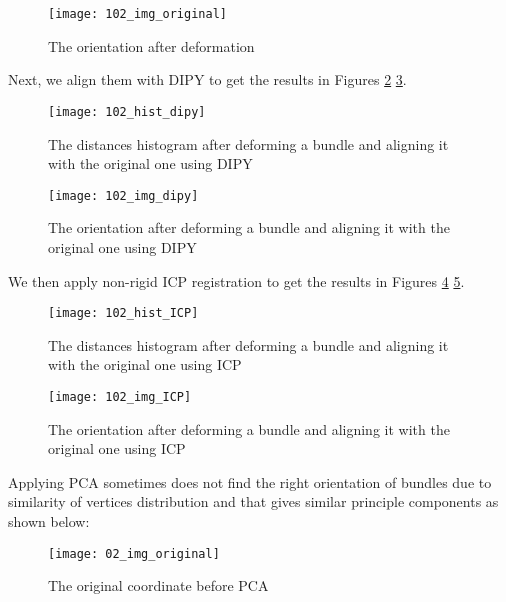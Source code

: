 \documentclass[../structure.tex]{subfiles}
\begin{document}
\begin{figure}[h!]
\centering
\texttt{[image: 102\_img\_original]}
\captionsetup{justification=centering}
\caption{The orientation after deformation}
\label{fig:img_original_def}
\end{figure}
\pagebreak

Next, we align them with DIPY to get the results in Figures \ref{fig:hist_dipy_def} \ref{fig:img_dipy_def}.

\begin{figure}[h!]
\centering
\texttt{[image: 102\_hist\_dipy]}
\captionsetup{justification=centering}
\caption{The distances histogram after deforming a bundle and aligning it with the original one using DIPY}
\label{fig:hist_dipy_def}
\end{figure}

\begin{figure}[h!]
\centering
\texttt{[image: 102\_img\_dipy]}
\captionsetup{justification=centering}
\caption{The orientation after deforming a bundle and aligning it with the original one using DIPY}
\label{fig:img_dipy_def}
\end{figure}
\pagebreak
We then apply non-rigid ICP registration to get the results in Figures \ref{fig:hist_icp_def} \ref{fig:img_icp_def}.

\begin{figure}[h!]
\centering
\texttt{[image: 102\_hist\_ICP]}
\captionsetup{justification=centering}
\caption{The distances histogram after deforming a bundle and aligning it with the original one using ICP}
\label{fig:hist_icp_def}
\end{figure}

\begin{figure}[h!]
\centering
\texttt{[image: 102\_img\_ICP]}
\captionsetup{justification=centering}
\caption{The orientation after deforming a bundle and aligning it with the original one using ICP}
\label{fig:img_icp_def}
\end{figure}

\pagebreak

Applying PCA sometimes does not find the right orientation of bundles due to similarity of vertices distribution and that gives similar principle components as shown below:


	\begin{figure}[h!]
	\centering
	\texttt{[image: 02\_img\_original]}
	\captionsetup{justification=centering}
	\caption{The original coordinate before PCA}
	\label{fig:all_brain}
	\end{figure}
	
\end{document}
